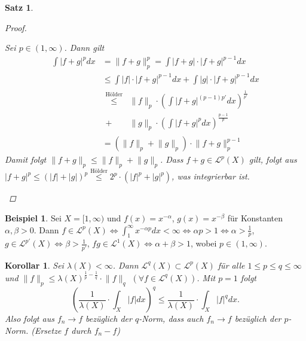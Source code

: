 \documentclass[a4paper]{report}
\newcommand{\Leb}{\mathcal{L}}
\newcommand{\jlabel}[1]{\label{j_#1}}
\theoremstyle{plain}
\newtheorem{satz}[thm]{Satz}
\newtheorem{kor}[thm]{Korollar}
\theoremstyle{definition}
\newtheorem{expl}[thm]{Beispiel}
\begin{document}
{{{{\begin{satz}
\begin{proof}
\begin{enumerate}
                Sei \uline{$p\in(1,\infty)$}. Dann gilt
                \[
                    \begin{split}
                        \int |f+g|^p dx &= \lVert f + g \rVert_p^p = \int |f+g| \cdot |f+g|^{p-1} dx\\
                                        &\le \int |f|\cdot |f+g|^{p-1} dx + \int |g| \cdot |f+g|^{p-1} dx\\
                                        &\begin{split}
                                            \overset{\text{Hölder}}{\le} &\lVert f \rVert_p \cdot \left(\int |f+g|^{(p-1)p'} dx \right)^\frac{1}{p'}\\
                                            + &\lVert g \rVert_p \cdot \left(\int |f+g|^p dx \right)^\frac{p-1}{p}
                                         \end{split}\\
                                        &= (\lVert f \rVert_p + \lVert g \rVert_p)\cdot \lVert f+g \rVert_p^{p-1} 
                    \end{split}
                \]
                Damit folgt $\lVert f+g \rVert_p \le \lVert f \rVert_p + \lVert g \rVert_p$. Dass $f+g \in \Leb^p(X)$ gilt, folgt aus $|f+g|^p \le (|f| + |g|)^p \overset{\text{{Hölder}}}{\le} 2^p\cdot (|f|^p + |g|^p)$, was integrierbar ist.
        \end{enumerate}
    \end{proof}
\end{satz}

\begin{expl}
    \jlabel{Bsp 5.2}
    Sei $X = [1,\infty)$ und $f(x) = x^{-\alpha}$, $g(x)=x^{-\beta}$ für Konstanten $\alpha, \beta >0$. Dann $f\in \Leb^p(X) \Leftrightarrow \int_1^\infty x^{-\alpha p} dx < \infty \Leftrightarrow \alpha p > 1 \Leftrightarrow \alpha > \frac{1}{p}$, $g\in \Leb^{p'}(X) \Leftrightarrow \beta > \frac{1}{p'}$, $fg \in \Leb^1(X) \Leftrightarrow \alpha + \beta > 1$, wobei $p \in (1,\infty)$.
\end{expl}


\begin{kor}
    \jlabel{Kor 5.3}
    Sei $\lambda(X) < \infty$. Dann $\Leb^q(X) \subset \Leb^p(X)$ für alle $1\le p \le q \le  \infty$ und $\lVert f \rVert_p \le \lambda(X)^{\frac{1}{p}-\frac{1}{q}}\cdot \lVert f \rVert_q$ $(\forall f \in \Leb^q(X))$. Mit $p=1$ folgt
    \[
        \left(\frac{1}{\lambda(X)} \cdot \int_X |f|dx \right)^q \le \frac{1}{\lambda(X)}\cdot \int_X |f|^q dx.
    \]
    Also folgt aus $f_n \to f$ bezüglich der $q$-Norm, dass auch $f_n \to f$ bezüglich der $p$-Norm. (Ersetze $f$ durch $f_n-f$)
    

\end{kor}}}}}
\end{document}
